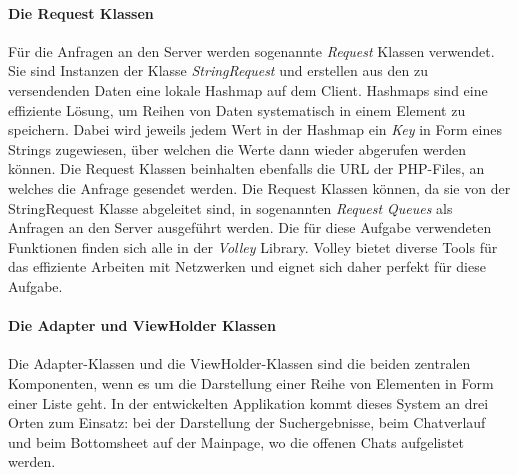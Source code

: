 \documentclass[a4paper,11pt]{report}
\begin{document}
				\paragraph{Die Request Klassen}
				Für die Anfragen an den Server werden sogenannte \emph{Request} Klassen verwendet. Sie sind Instanzen der Klasse \emph{StringRequest} und erstellen aus den zu versendenden Daten eine lokale Hashmap auf dem Client. Hashmaps sind eine effiziente Lösung, um Reihen von Daten systematisch in einem Element zu speichern. Dabei wird jeweils jedem Wert in der Hashmap ein \emph{Key} in Form eines Strings zugewiesen, über welchen die Werte dann wieder abgerufen werden können. Die Request Klassen beinhalten ebenfalls die URL der PHP-Files, an welches die Anfrage gesendet werden. Die Request Klassen können, da sie von der StringRequest Klasse abgeleitet sind, in sogenannten \emph{Request Queues} als Anfragen an den Server ausgeführt werden. Die für diese Aufgabe verwendeten Funktionen finden sich alle in der \emph{Volley} Library. Volley bietet diverse Tools für das effiziente Arbeiten mit Netzwerken und eignet sich daher perfekt für diese Aufgabe.\cite{volley}
				\paragraph{Die Adapter und ViewHolder Klassen}\label{adapter}
				Die Adapter-Klassen und die ViewHolder-Klassen sind die beiden zentralen Komponenten, wenn es um die Darstellung einer Reihe von Elementen in Form einer Liste geht. In der entwickelten Applikation kommt dieses System an drei Orten zum Einsatz: bei der Darstellung der Suchergebnisse, beim Chatverlauf und beim Bottomsheet auf der Mainpage, wo die offenen Chats aufgelistet werden.
				
\end{document}

